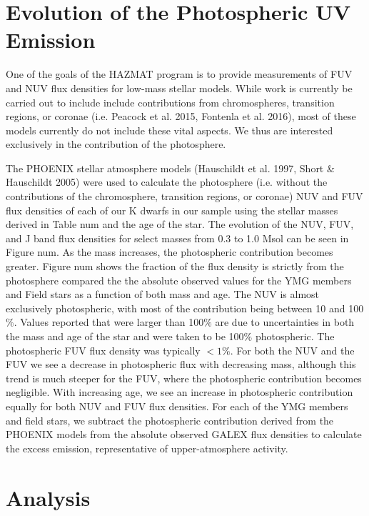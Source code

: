 \documentclass[twocolumn]{aastex62}
\begin{document}
\section{Evolution of the Photospheric UV Emission}

One of the goals of the HAZMAT program is to provide measurements of FUV and NUV flux densities for low-mass stellar models. While work is currently be carried out to include include contributions from chromospheres, transition regions, or coronae (i.e. Peacock et al. 2015, Fontenla et al. 2016), most of these models currently do not include these vital aspects. We thus are interested exclusively in the contribution of the photosphere. 

The PHOENIX stellar atmosphere models (Hauschildt et al. 1997, Short & Hauschildt 2005) were used to calculate the photosphere (i.e. without the contributions of the chromosphere, transition regions, or coronae) NUV and FUV flux densities of each of our K dwarfs in our sample using the stellar masses derived in Table num and the age of the star. The evolution of the NUV, FUV, and J band flux densities for select masses from 0.3 to 1.0 Msol can be seen in Figure num.  As the mass increases, the photospheric contribution becomes greater. 
Figure num shows the fraction of the flux density is strictly from the photosphere compared the the absolute observed values for the YMG members and Field stars as a function of both mass and age. The NUV is almost exclusively photospheric, with most of the contribution being between 10 and 100$\%$. Values reported that were larger than 100$\%$ are due to uncertainties in both the mass and age of the star and were taken to be 100$\%$ photospheric. The photospheric FUV flux density was typically $<1\%$. For both the NUV and the FUV we see a decrease in photospheric flux with decreasing mass, although this trend is much steeper for the FUV, where the photospheric contribution becomes negligible. With increasing age, we see an increase in photospheric contribution equally for both NUV and FUV flux densities. 
For each of the YMG members and field stars, we subtract the photospheric contribution derived from the PHOENIX models from the absolute observed GALEX flux densities to calculate the excess emission, representative of upper-atmosphere activity. 




\section{Analysis}
\end{document}

